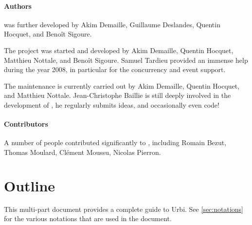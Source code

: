 \paragraph{Authors}
 was further developed by Akim Demaille, Guillaume Deslandes, Quentin
Hocquet, and Benoît Sigoure.

The  project was started and developed by Akim Demaille, Quentin
Hocquet, Matthieu Nottale, and Benoît Sigoure.  Samuel Tardieu provided an
immense help during the year 2008, in particular for the concurrency and
event support.

The maintenance is currently carried out by Akim Demaille, Quentin
Hocquet, and Matthieu Nottale.  Jean-Christophe Baillie is still
deeply involved in the development of \us, he regularly submits ideas,
and occasionally even code!

\paragraph{Contributors}

A number of people contributed significantly to \urbi, including Romain
Bezut, Thomas Moulard, Clément Moussu, Nicolas Pierron.

\section{Outline}

This multi-part document provides a complete guide to Urbi.  See
\autoref{sec:notations} for the various notations that are used in the
document.

\newenvironment{partDescription}[2]
{%
  \item[\autoref{#1} --- \nameref{#1}]~\\%
  #2
  \begin{description}%
    \let\itemOrig\item%
    \renewcommand{\item}[1][]{\itemOrig[~~\autoref{##1} --- \nameref{##1}]~\\}%
  }{%
  \end{description}%
}

\begin{description}




{
  
}

\end{description}


